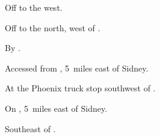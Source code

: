 
\begin{LocationList}

Off  to the west.

Off  to the north, west of .

By .

Accessed from  , 5~miles east of Sidney.

At the Phoenix truck stop southwest of  .

On  , 5~miles east of Sidney.

Southeast of  .

\end{LocationList}
